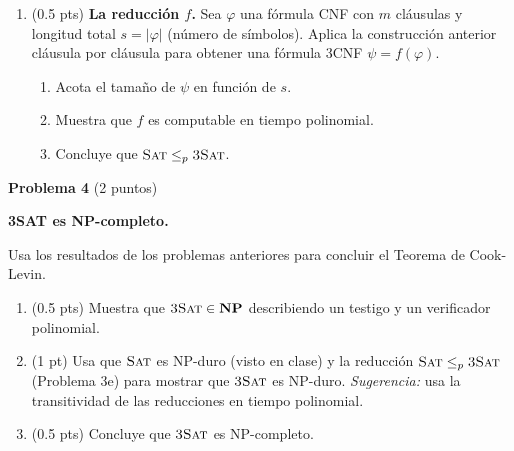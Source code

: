 \documentclass[12pt, letterpaper]{article}
\newcommand{\SAT}{\textsc{Sat}}
\newcommand{\tSAT}{\textsc{3Sat}}
\newcommand{\NP}{\mathbf{NP}}
\newcommand{\problema}[2]{%
  \bigskip
  \noindent\textbf{Problema #1} \textnormal{(#2 puntos)}\par\smallskip
}
\begin{document}
\begin{enumerate}[label=\alph*)]
\begin{enumerate}[label=\roman*.]
      \textit{Sugerencia:} En el paso base, aplica el inciso (b) con
      $\ell_1, \ell_2$ y $z_1$ para obtener una cláusula $(\ell_1 \vee \ell_2
      \vee z_1)$ y luego recurre sobre $(\bar{z}_1 \vee \ell_3 \vee \cdots
      \vee \ell_k)$.

    \item ¿Cuántas variables auxiliares se introducen?
    \item ¿Cuántas cláusulas de tamaño 3 produce la construcción?
    \item Argumenta (por inducción o por el mismo razonamiento del inciso c)
      que la conjunción resultante es satisfacible si y solo si $C$ lo es.
  \end{enumerate}

\item (0.5 pts) \textbf{La reducción $f$.}
  Sea $\varphi$ una fórmula CNF con $m$ cláusulas y longitud total
  $s = |\varphi|$ (número de símbolos).  Aplica la construcción anterior
  cláusula por cláusula para obtener una fórmula 3CNF $\psi = f(\varphi)$.
  \begin{enumerate}[label=\roman*.]
    \item Acota el tamaño de $\psi$ en función de $s$.
    \item Muestra que $f$ es computable en tiempo polinomial.
    \item Concluye que $\SAT \leq_p \tSAT$.
  \end{enumerate}

\end{enumerate}

\problema{4}{2} \textbf{3SAT es NP-completo.}

Usa los resultados de los problemas anteriores para concluir el Teorema de
Cook-Levin.

\begin{enumerate}[label=\alph*)]

\item (0.5 pts) Muestra que $\tSAT \in \NP$ describiendo un testigo y un
  verificador polinomial.

\item (1 pt) Usa que $\SAT$ es NP-duro (visto en clase) y la reducción
  $\SAT \leq_p \tSAT$ (Problema 3e) para mostrar que $\tSAT$ es NP-duro.
  \textit{Sugerencia:} usa la transitividad de las reducciones en tiempo
  polinomial.

\item (0.5 pts) Concluye que $\tSAT$ es NP-completo.

\end{enumerate}
\end{document}
